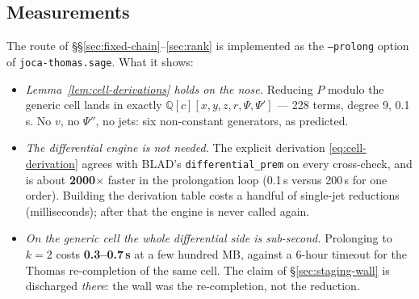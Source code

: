 \documentclass[11pt]{article}
\newcommand{\Psib}{\Psi}
\newcommand{\code}[1]{\texttt{#1}}
\begin{document}
\subsection{Measurements}
\label{sec:fc-measurements}

The route of \S\S\ref{sec:fixed-chain}--\ref{sec:rank} is implemented as the
\code{--prolong} option of \code{joca-thomas.sage}. What it shows:

\begin{itemize}
\item \emph{Lemma~\ref{lem:cell-derivations} holds on the nose.} Reducing $P$
  modulo the generic cell lands in exactly
  $\mathbb{Q}[c][x,y,z,r,\Psib,\Psib']$ --- 228 terms, degree 9, 0.1\,s. No
  $v$, no $\Psib''$, no jets: six non-constant generators, as predicted.
\item \emph{The differential engine is not needed.} The explicit derivation
  \eqref{eq:cell-derivation} agrees with BLAD's \code{differential\_prem} on
  every cross-check, and is about \textbf{2000$\times$} faster in the
  prolongation loop (0.1\,s versus 200\,s for one order). Building the derivation
  table costs a handful of single-jet reductions (milliseconds); after that the
  engine is never called again.
\item \emph{On the generic cell the whole differential side is sub-second.}
  Prolonging to $k=2$ costs \textbf{0.3--0.7\,s} at a few hundred MB, against a
  6-hour timeout for the Thomas re-completion of the same cell. The claim of
  \S\ref{sec:staging-wall} is discharged \emph{there}: the wall was the
  re-completion, not the reduction.


\end{itemize}
\end{document}
